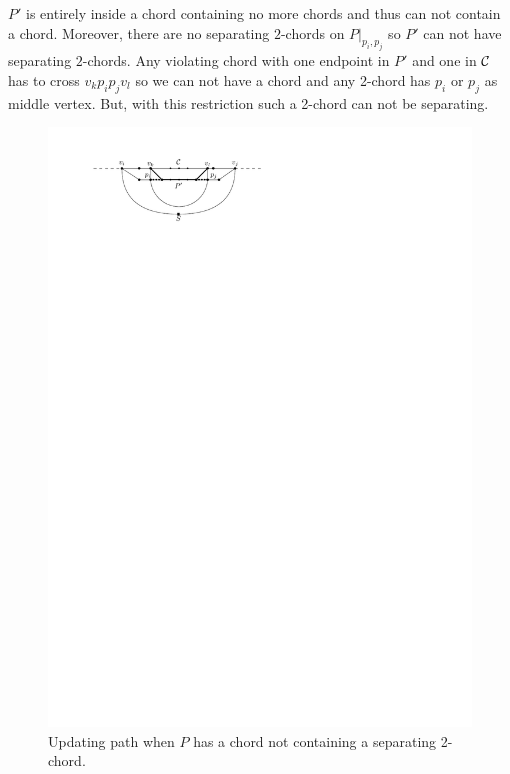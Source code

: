       $P'$ is entirely inside a chord containing no more chords and thus can not contain a chord. Moreover, there are no separating $2$-chords on $P|_{p_i, p_j}$ so $P'$ can not have separating $2$-chords. Any violating chord with one endpoint in $P'$ and one in $\mathcal{C}$ has to cross $v_k p_i p_j v_l$ so we can not have a chord and any 2-chord has $p_i$ or $p_j$ as middle vertex. But, with this restriction such a 2-chord can not be separating.

      \begin{figure}[!b]
        \centering
        \includegraphics[scale=1]{unifiedAlgo/img/sweep/cases/chordUpdate}
        \caption{Updating path when $P$ has a chord not containing a separating 2-chord.}
        \label{fig:sweep:chordUpdate}

\end{figure}
